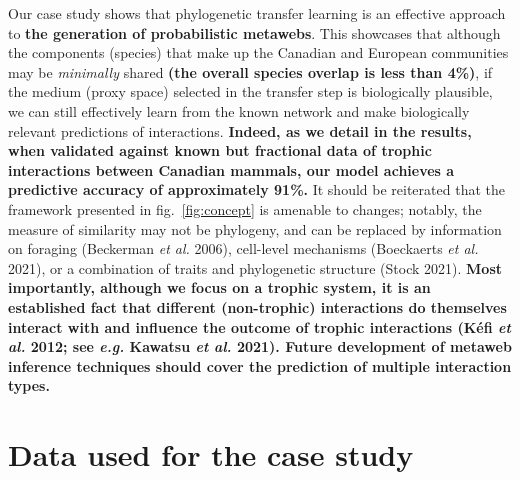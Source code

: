 \documentclass[11pt]{article}
\makeatletter
\def\maxwidth{\ifdim\Gin@nat@width>\linewidth\linewidth
\else\Gin@nat@width\fi}
\let\Oldincludegraphics\includegraphics
\renewcommand{\includegraphics}[1]{\Oldincludegraphics[width=\maxwidth]{#1}}
\providecommand{\DIFaddtex}[1]{{\bf #1}} %
\providecommand{\DIFdeltex}[1]{} %
\providecommand{\DIFaddbegin}{\protect\color{blue}} %
\providecommand{\DIFaddend}{\protect\color{black}} %
\providecommand{\DIFdelbegin}{\protect\color{red}} %
\providecommand{\DIFdelend}{\protect\color{black}} %
\providecommand{\DIFadd}[1]{\texorpdfstring{\DIFaddtex{#1}}{#1}} %
\providecommand{\DIFdel}[1]{\texorpdfstring{\DIFdeltex{#1}}{}} %
\newcommand{\DIFscaledelfig}{0.5}
\newlength{\DIFdelgraphicswidth} %
\newlength{\DIFdelgraphicsheight} %
\newcommand{\DIFaddincludegraphics}[2][]{{\color{blue}\fbox{\DIFOincludegraphics[#1]{#2}}}} %
\newcommand{\DIFdelincludegraphics}[2][]{%
\sbox{\DIFdelgraphicsbox}{\DIFOincludegraphics[#1]{#2}}%
\settoboxwidth{\DIFdelgraphicswidth}{\DIFdelgraphicsbox} %
\settoboxtotalheight{\DIFdelgraphicsheight}{\DIFdelgraphicsbox} %
\scalebox{\DIFscaledelfig}{%
\parbox[b]{\DIFdelgraphicswidth}{\usebox{\DIFdelgraphicsbox}\\[-\baselineskip] \rule{\DIFdelgraphicswidth}{0em}}\llap{\resizebox{\DIFdelgraphicswidth}{\DIFdelgraphicsheight}{%
\setlength{\unitlength}{\DIFdelgraphicswidth}%
\begin{picture}(1,1)%
\thicklines\linethickness{2pt} %
{\color[rgb]{1,0,0}\put(0,0){\framebox(1,1){}}}%
{\color[rgb]{1,0,0}\put(0,0){\line( 1,1){1}}}%
{\color[rgb]{1,0,0}\put(0,1){\line(1,-1){1}}}%
\end{picture}%
}\hspace*{3pt}}} %
} %
\DeclareRobustCommand{\DIFaddbegin}{\DIFOaddbegin \let\includegraphics\DIFaddincludegraphics} %
\DeclareRobustCommand{\DIFaddend}{\DIFOaddend \let\includegraphics\DIFOincludegraphics} %
\DeclareRobustCommand{\DIFdelbegin}{\DIFOdelbegin \let\includegraphics\DIFdelincludegraphics} %
\DeclareRobustCommand{\DIFdelend}{\DIFOaddend \let\includegraphics\DIFOincludegraphics} %
\makeatother
\begin{document}
\DIFaddend Our case study shows that phylogenetic transfer learning is \DIFdelbegin \DIFdel{indeed }\DIFdelend an effective
approach to \DIFdelbegin \DIFdel{predict the Canadian mammalian metaweb}\DIFdelend \DIFaddbegin \DIFadd{the generation of probabilistic metawebs}\DIFaddend . This showcases
that although the components (species) that make up the Canadian and
European communities may be \emph{minimally} shared \DIFaddbegin \DIFadd{(the overall species
overlap is less than 4\%)}\DIFaddend , if the medium (proxy space) selected in the
transfer step is biologically plausible, we can still effectively learn
from the known network and make biologically relevant predictions of
interactions. \DIFaddbegin \DIFadd{Indeed, as we detail in the results, when validated
against known but fractional data of trophic interactions between
Canadian mammals, our model achieves a predictive accuracy of
approximately 91\%. }\DIFaddend It should be reiterated that the framework presented
in fig.~\ref{fig:concept} is amenable to changes; notably, the measure
of similarity may not be phylogeny, and can be replaced by information
on foraging (Beckerman \emph{et al.} 2006), cell-level mechanisms
(Boeckaerts \emph{et al.} 2021), or a combination of traits and
phylogenetic structure (Stock 2021). \DIFaddbegin \DIFadd{Most importantly, although we focus
on a trophic system, it is an established fact that different
(non-trophic) interactions do themselves interact with and influence the
outcome of trophic interactions (Kéfi \emph{et al.} 2012; see
\emph{e.g.} Kawatsu \emph{et al.} 2021). Future development of metaweb
inference techniques should cover the prediction of multiple interaction
types.
}\DIFaddend 

\hypertarget{data-used-for-the-case-study}{%
\section{Data used for the case
study}\label{data-used-for-the-case-study}}
\end{document}
